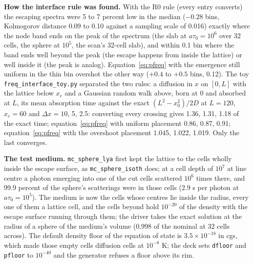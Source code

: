 \documentclass[11pt]{article}
\newcommand{\key}[1]{\texttt{#1}}
\begin{document}
\textbf{How the interface rule was found.}  With the R0 rule (every entry converts)
the escaping spectra were 5 to 7 percent low in the median ($-0.28$ bins, Kolmogorov
distance 0.09 to 0.10 against a sampling scale of 0.016) exactly where the node band
ends on the peak of the spectrum (the slab at $a\tau_0 = 10^6$ over 32 cells, the
sphere at $10^5$, the scan's 32-cell slab), and within 0.1 bin where the band ends
well beyond the peak (the escape happens from inside the lattice) or well inside it
(the peak is analog).  Equation~\ref{eq:pfreq} with the emergence still uniform in the
thin bin overshot the other way ($+0.4$ to $+0.5$ bins, 0.12).  The toy
\texttt{freq\_interface\_toy.py} separated the two rules: a diffusion in $x$ on
$[0, L]$ with the lattice below $x_e$ and a Gaussian random walk above, born at 0 and
absorbed at $L$, its mean absorption time against the exact $(L^2 - x_0^2)/2D$ at
$L = 120$, $x_e = 60$ and $\Delta x = 10$, 5, 2.5: converting every crossing gives
1.36, 1.31, 1.18 of the exact time; equation~\ref{eq:pfreq} with uniform placement
0.86, 0.87, 0.91; equation~\ref{eq:pfreq} with the overshoot placement 1.045, 1.022,
1.019.  Only the last converges.

\textbf{The test medium.}  \texttt{mc\_sphere\_lya} first kept the lattice to the
cells wholly inside the escape surface, as \texttt{mc\_sphere\_isoth} does; at a cell
depth of $10^7$ at line centre a photon emerging into one of the cut cells scattered
$10^6$ times there, and 99.9 percent of the sphere's scatterings were in those cells
(2.9 s per photon at $a\tau_0 = 10^5$).  The medium is now the cells whose centres lie
inside the radius, every one of them a lattice cell, and the cells beyond hold
$10^{-20}$ of the density with the escape surface running through them; the driver
takes the exact solution at the radius of a sphere of the medium's volume (0.998 of
the nominal at 32 cells across).  The default density floor of the equation of state
is $3.5\times10^{-18}$ in cgs, which made those empty cells diffusion cells at
$10^{-8}$ K; the deck sets \key{dfloor} and \key{pfloor} to $10^{-40}$ and the
generator refuses a floor above its rim.
\end{document}
